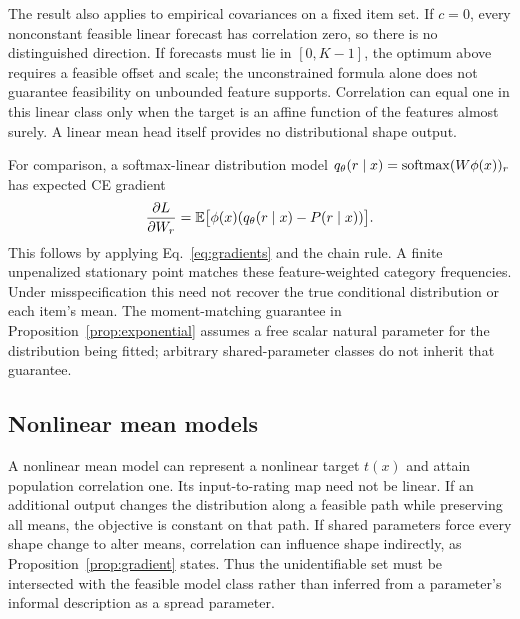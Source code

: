 The result also applies to empirical covariances on a fixed item set.
If $c=0$, every nonconstant feasible linear forecast has correlation zero, so there is no distinguished direction.
If forecasts must lie in $[0,K-1]$, the optimum above requires a feasible offset and scale; the unconstrained formula alone does not guarantee feasibility on unbounded feature supports.
Correlation can equal one in this linear class only when the target is an affine function of the features almost surely.
A linear mean head itself provides no distributional shape output.

For comparison, a softmax-linear distribution model $q_\theta(r\mid x)=\operatorname{softmax}(W\phi(x))_r$ has expected CE gradient
\[
 \frac{\partial L}{\partial W_r}=\mathbb{E}\big[\phi(x)(q_\theta(r\mid x)-P(r\mid x))\big].
\]
This follows by applying Eq.~\eqref{eq:gradients} and the chain rule.
A finite unpenalized stationary point matches these feature-weighted category frequencies.
Under misspecification this need not recover the true conditional distribution or each item's mean.
The moment-matching guarantee in Proposition~\ref{prop:exponential} assumes a free scalar natural parameter for the distribution being fitted; arbitrary shared-parameter classes do not inherit that guarantee.

\subsection{Nonlinear mean models}
A nonlinear mean model can represent a nonlinear target $t(x)$ and attain population correlation one.
Its input-to-rating map need not be linear.
If an additional output changes the distribution along a feasible path while preserving all means, the objective is constant on that path.
If shared parameters force every shape change to alter means, correlation can influence shape indirectly, as Proposition~\ref{prop:gradient} states.
Thus the unidentifiable set must be intersected with the feasible model class rather than inferred from a parameter's informal description as a spread parameter.
